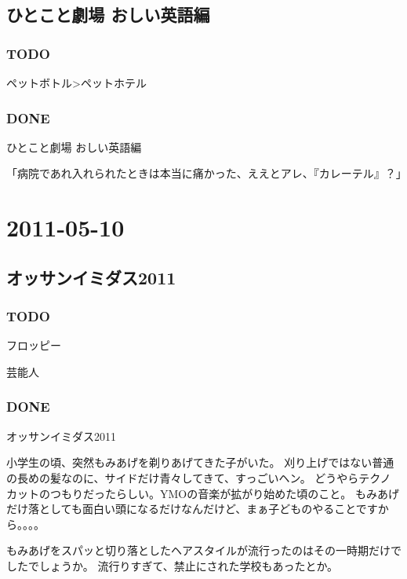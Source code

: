 \documentclass[11pt]{article}
\begin{document}
\subsection{ひとこと劇場 おしい英語編}
\label{sec-124_3}
\subsubsection{\textbf{TODO}}
\label{sec-124_3_1}

ペットボトル>ペットホテル
\subsubsection{\textbf{DONE}}
\label{sec-124_3_2}

ひとこと劇場 おしい英語編

「病院であれ入れられたときは本当に痛かった、ええとアレ、『カレーテル』？」
\subsubsection{}
\section{2011-05-10}
\label{sec-125}
\subsection{オッサンイミダス2011}
\label{sec-125_1}
\subsubsection{\textbf{TODO}}
\label{sec-125_1_1}

フロッピー

芸能人
\subsubsection{\textbf{DONE}}
\label{sec-125_1_2}

オッサンイミダス2011

小学生の頃、突然もみあげを剃りあげてきた子がいた。
刈り上げではない普通の長めの髪なのに、サイドだけ青々してきて、すっごいヘン。
どうやらテクノカットのつもりだったらしい。YMOの音楽が拡がり始めた頃のこと。
もみあげだけ落としても面白い頭になるだけなんだけど、まぁ子どものやることですから。。。。

もみあげをスパッと切り落としたヘアスタイルが流行ったのはその一時期だけでしたでしょうか。
流行りすぎて、禁止にされた学校もあったとか。
\end{document}
